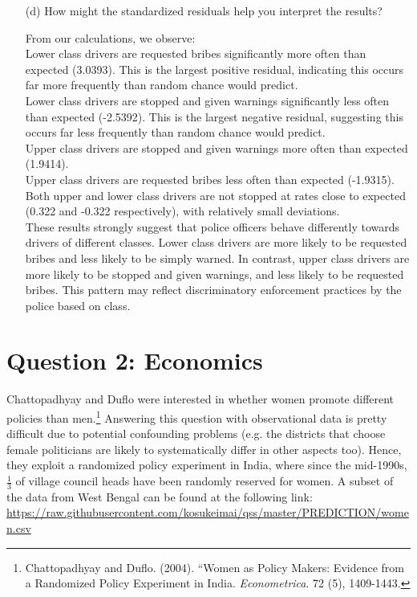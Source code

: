 \documentclass[12pt,letterpaper]{article}
\begin{document}
\begin{enumerate}
\begin{table}[h]
\begin{tabular}{l | c c c }
		\end{tabular}
	\end{table}
	
	
	\newpage
	\item [(d)] How might the standardized residuals help you interpret the results?  \\
	\vspace{1cm}
	
	From our calculations, we observe:\\
	
	Lower class drivers are requested bribes significantly more often than expected (3.0393). This is the largest positive residual, indicating this occurs far more frequently than random chance would predict.\\
	Lower class drivers are stopped and given warnings significantly less often than expected (-2.5392). This is the largest negative residual, suggesting this occurs far less frequently than random chance would predict.\\
	Upper class drivers are stopped and given warnings more often than expected (1.9414).\\
	Upper class drivers are requested bribes less often than expected (-1.9315).\\
	Both upper and lower class drivers are not stopped at rates close to expected (0.322 and -0.322 respectively), with relatively small deviations.\\
	
	These results strongly suggest that police officers behave differently towards drivers of different classes. Lower class drivers are more likely to be requested bribes and less likely to be simply warned. In contrast, upper class drivers are more likely to be stopped and given warnings, and less likely to be requested bribes. This pattern may reflect discriminatory enforcement practices by the police based on class.
	
\end{enumerate}
\newpage

\section*{Question 2: Economics}
Chattopadhyay and Duflo were interested in whether women promote different policies than men.\footnote{Chattopadhyay and Duflo. (2004). ``Women as Policy Makers: Evidence from a Randomized Policy Experiment in India. \textit{Econometrica}. 72 (5), 1409-1443.} Answering this question with observational data is pretty difficult due to potential confounding problems (e.g. the districts that choose female politicians are likely to systematically differ in other aspects too). Hence, they exploit a randomized policy experiment in India, where since the mid-1990s, $\frac{1}{3}$ of village council heads have been randomly reserved for women. A subset of the data from West Bengal can be found at the following link: \url{https://raw.githubusercontent.com/kosukeimai/qss/master/PREDICTION/women.csv}\\
\end{document}
